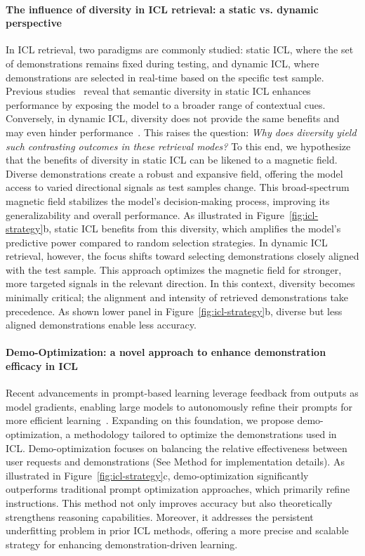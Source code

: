 \paragraph{The influence of diversity in ICL retrieval: a static vs. dynamic perspective}
In ICL retrieval, two paradigms are commonly studied: static ICL, where the set of demonstrations remains fixed during testing, and dynamic ICL, where demonstrations are selected in real-time based on the specific test sample. Previous studies~\citep{li-qiu-2023-finding} reveal that semantic diversity in static ICL enhances performance by exposing the model to a broader range of contextual cues. Conversely, in dynamic ICL, diversity does not provide the same benefits and may even hinder performance~\cite{qin2024what}. This raises the question: \textit{Why does diversity yield such contrasting outcomes in these retrieval modes?}
To this end, we hypothesize that the benefits of diversity in static ICL can be likened to a magnetic field. Diverse demonstrations create a robust and expansive field, offering the model access to varied directional signals as test samples change. This broad-spectrum magnetic field stabilizes the model’s decision-making process, improving its generalizability and overall performance. As illustrated in Figure~\ref{fig:icl-strategy}b, static ICL benefits from this diversity, which amplifies the model's predictive power compared to random selection strategies.
In dynamic ICL retrieval, however, the focus shifts toward selecting demonstrations closely aligned with the test sample. This approach optimizes the magnetic field for stronger, more targeted signals in the relevant direction. In this context, diversity becomes minimally critical; the alignment and intensity of retrieved demonstrations take precedence. As shown lower panel in Figure~\ref{fig:icl-strategy}b, diverse but less aligned demonstrations enable less accuracy.

\paragraph{Demo-Optimization: a novel approach to enhance demonstration efficacy in ICL}

Recent advancements in prompt-based learning leverage feedback from outputs as model gradients, enabling large models to autonomously refine their prompts for more efficient learning~\citep{yuksekgonul2024textgrad}. Expanding on this foundation, we propose demo-optimization, a methodology tailored to optimize the demonstrations used in ICL. Demo-optimization focuses on balancing the relative effectiveness between user requests and demonstrations (See Method for implementation details).
As illustrated in Figure~\ref{fig:icl-strategy}c, demo-optimization significantly outperforms traditional prompt optimization approaches, which primarily refine instructions. This method not only improves accuracy but also theoretically strengthens reasoning capabilities. Moreover, it addresses the persistent underfitting problem in prior ICL methods, offering a more precise and scalable strategy for enhancing demonstration-driven learning.





